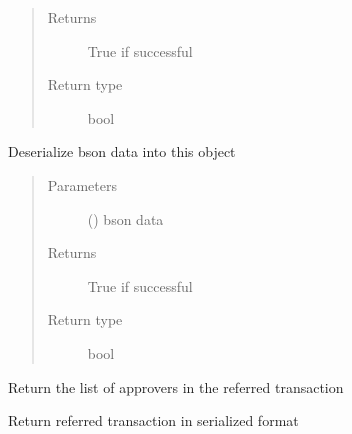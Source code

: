 \documentclass[letterpaper,10pt,english]{sphinxmanual}
\begin{document}
\begin{fulllineitems}
\begin{fulllineitems}
\begin{quote}
\begin{description}
\item[{Returns}] \leavevmode
True if successful

\item[{Return type}] \leavevmode
bool

\end{description}\end{quote}

\end{fulllineitems}


\begin{fulllineitems}
\label{\detokenize{bbc1.core.bbclib:bbc1.core.bbclib.BBcReference.deserialize_bson}}
Deserialize bson data into this object
\begin{quote}\begin{description}
\item[{Parameters}] \leavevmode
{} () \textendash{} bson data

\item[{Returns}] \leavevmode
True if successful

\item[{Return type}] \leavevmode
bool

\end{description}\end{quote}

\end{fulllineitems}


\begin{fulllineitems}
\label{\detokenize{bbc1.core.bbclib:bbc1.core.bbclib.BBcReference.get_destinations}}
Return the list of approvers in the referred transaction

\end{fulllineitems}


\begin{fulllineitems}
\label{\detokenize{bbc1.core.bbclib:bbc1.core.bbclib.BBcReference.get_referred_transaction}}
Return referred transaction in serialized format


\end{fulllineitems}
\end{fulllineitems}
\end{document}

